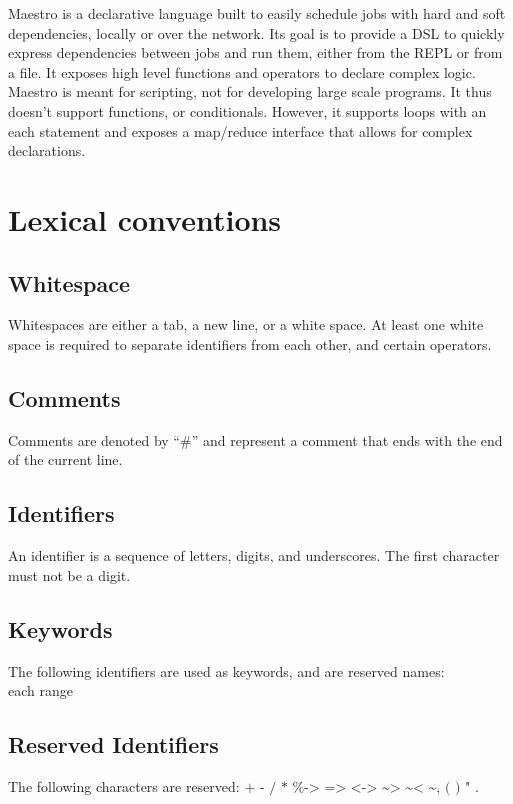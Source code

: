 Maestro is a declarative language built to easily schedule jobs with hard and
soft dependencies, locally or over the network.  Its goal is to provide a DSL to
quickly express dependencies between jobs and run them, either from the
REPL or from a file. It exposes high level functions and operators to declare
complex logic. Maestro is meant for scripting, not for developing large scale
programs. It thus doesn't support functions, or conditionals. However, it
supports loops with an each statement and exposes a map/reduce interface that
allows for complex declarations.

\section{Lexical conventions}
\subsection{Whitespace}
Whitespaces are either a tab, a new line, or a white space. At least one white
space is required to separate identifiers from each other, and certain
operators.

\subsection{Comments}
Comments are denoted by ``\#'' and represent a comment that ends with the end of
the current line.

\subsection{Identifiers}
An identifier is a sequence of letters, digits, and underscores. The first
character must not be a digit.

\subsection{Keywords}
The following identifiers are used as keywords, and are reserved names:\\
each range

\subsection{Reserved Identifiers}
The following characters are reserved: $\texttt{+ - / * \% -> => <-> \textasciitilde>
\textasciitilde< \textasciitilde , ( ) " .}$


